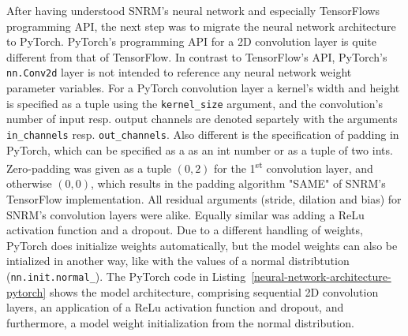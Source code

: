 After having understood SNRM's neural network and especially TensorFlows programming API,
    the next step was to migrate the neural network architecture to PyTorch.
PyTorch's programming API for a 2D convolution layer is quite different from that of TensorFlow.
In contrast to TensorFlow's API, PyTorch's \texttt{nn.Conv2d} layer
    is not intended to reference any neural network weight parameter variables.
For a PyTorch convolution layer a kernel's width and height is specified as a tuple
    using the \texttt{kernel\_size} argument, and the convolution's number of input resp. output channels
    are denoted separtely with the arguments \texttt{in\_channels} resp. \texttt{out\_channels}.
Also different is the specification of padding in PyTorch, which can be specified as a as an int number or
    as a tuple of two ints.
Zero-padding was given as a tuple $(0, 2)$ for the 1\textsuperscript{st} convolution layer,
    and otherwise $(0, 0)$, which results in the padding algorithm "SAME" of SNRM's TensorFlow implementation.
All residual arguments (stride, dilation and bias) for SNRM's convolution layers were alike.
Equally similar was adding a ReLu activation function and a dropout.
Due to a different handling of weights, PyTorch does initialize weights automatically, 
    but the model weights can also be intialized in another way, like with the values of a 
    normal distribtution (\texttt{nn.init.normal\_}).
The PyTorch code in Listing~\ref{neural-network-architecture-pytorch} shows the model architecture, comprising sequential 
    2D convolution layers, an application of a ReLu activation function and dropout,
    and furthermore, a model weight initialization from the normal distribution.

